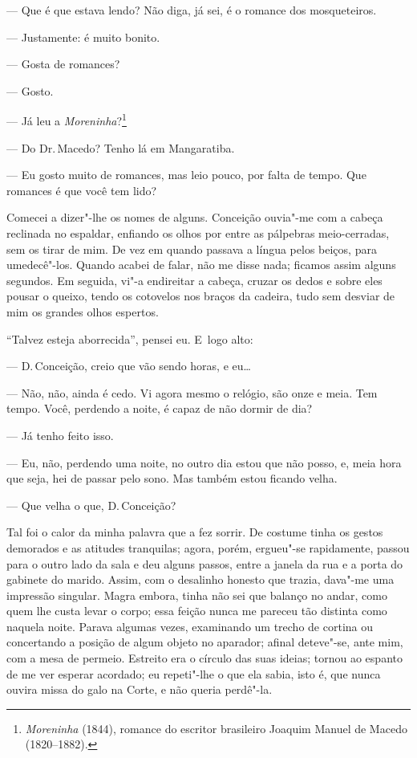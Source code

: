 \begin{linenumbers}
--- Que é que estava lendo? Não diga, já sei, é o romance dos
mosqueteiros.

--- Justamente: é muito bonito.

--- Gosta de romances?

--- Gosto.

--- Já leu a \emph{Moreninha}?\footnote{\emph{Moreninha} (1844), romance
  do escritor brasileiro Joaquim Manuel de Macedo (1820--1882).}

--- Do Dr.\,Macedo? Tenho lá em Mangaratiba.

--- Eu gosto muito de romances, mas leio pouco, por falta de tempo. Que
romances é que você tem lido?

Comecei a dizer"-lhe os nomes de alguns. Conceição ouvia"-me com a cabeça
reclinada no espaldar, enfiando os olhos por entre as pálpebras
meio-cerradas, sem os tirar de mim. De vez em quando passava a língua
pelos beiços, para umedecê"-los. Quando acabei de falar, não me disse
nada; ficamos assim alguns segundos. Em seguida, vi"-a endireitar a
cabeça, cruzar os dedos e sobre eles pousar o queixo, tendo os cotovelos
nos braços da cadeira, tudo sem desviar de mim os grandes olhos
espertos.

``Talvez esteja aborrecida'', pensei eu. E~logo alto:

--- D.\,Conceição, creio que vão sendo horas, e eu\ldots{}

--- Não, não, ainda é cedo. Vi agora mesmo o relógio, são onze e meia.
Tem tempo. Você, perdendo a noite, é capaz de não dormir de dia?

--- Já tenho feito isso.

--- Eu, não, perdendo uma noite, no outro dia estou que não posso, e,
meia hora que seja, hei de passar pelo sono. Mas também estou ficando
velha.

--- Que velha o que, D.\,Conceição?

Tal foi o calor da minha palavra que a fez sorrir. De costume tinha os
gestos demorados e as atitudes tranquilas; agora, porém, ergueu"-se
rapidamente, passou para o outro lado da sala e deu alguns passos, entre
a janela da rua e a porta do gabinete do marido. Assim, com o desalinho
honesto que trazia, dava"-me uma impressão singular. Magra embora, tinha
não sei que balanço no andar, como quem lhe custa levar o corpo; essa
feição nunca me pareceu tão distinta como naquela noite. Parava algumas
vezes, examinando um trecho de cortina ou concertando a posição de algum
objeto no aparador; afinal deteve"-se, ante mim, com a mesa de permeio.
Estreito era o círculo das suas ideias; tornou ao espanto de me ver
esperar acordado; eu repeti"-lhe o que ela sabia, isto é, que nunca
ouvira missa do galo na Corte, e não queria perdê"-la.


\end{linenumbers}

